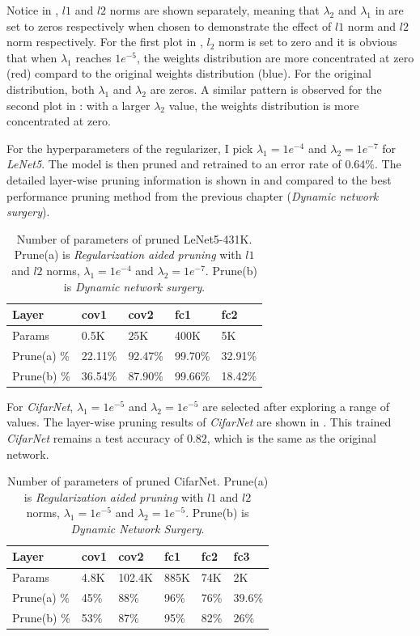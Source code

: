 \documentclass[a4paper,12pt]{report}
\begin{document}
Notice in , $l1$ and $l2$ norms are shown separately,
meaning that $\lambda_{2}$ and $\lambda_{1}$ in  are set to
zeros respectively when chosen to demonstrate the effect of $l1$ norm
and $l2$ norm respectively.
For the first plot in , $l_2$ norm is set to zero and it is
obvious that when $\lambda_1$ reaches $1e^{-5}$, the weights distribution are
more concentrated at zero (red) compard to the original weights distribution (blue).
For the original distribution, both $\lambda_1$ and $\lambda_2$ are zeros.
A similar pattern is observed for the second plot in : with a
larger $\lambda_2$ value, the weights distribution is more concentrated at zero.

For the hyperparameters of the regularizer, I pick $\lambda_1 = 1e^{-4}$ and $\lambda_2 = 1e^{-7}$ for \textit{LeNet5}.
The model is then pruned and retrained to an error rate of $0.64\%$.
The detailed layer-wise pruning information is shown in 
and compared to the best performance pruning method from the previous chapter (\textit{Dynamic network surgery}).

\begin{table}[!h]
\centering
\begin{tabular}{|l|l|l|l|l|}
\hline
Layer			&cov1	    &cov2	&fc1	&fc2 	\\	 \hline
Params		& 0.5K		&25K	&400K	&5K \\ \hline
Prune(a) \%	& 22.11\%		&92.47\%	&99.70\%	&32.91\%	\\
\hline
Prune(b) \%	& 36.54\%		&87.90\%	&99.66\%	&18.42\%	 \\
\hline
\end{tabular}
\caption{Number of parameters of pruned LeNet5-431K.
Prune(a) is \textit{Regularization aided pruning} with $l1$ and $l2$ norms,
$\lambda_1 = 1e^{-4}$ and $\lambda_2 = 1e^{-7}$.
Prune(b) is \textit{Dynamic network surgery}.}
\label{tab:LeNetprunel1l2}
\end{table}

For \textit{CifarNet}, $\lambda_{1} = 1e^{-5}$ and $\lambda_{2} = 1e^{-5}$
are selected after exploring a range of values.
The layer-wise pruning results of \textit{CifarNet} are shown
in .
This trained \textit{CifarNet} remains a test accuracy of $0.82$, which is the
same as the original network.
\begin{table}[!h]
\centering
\begin{tabular}{|l|l|l|l|l|l|}
\hline
Layer			&cov1	&cov2		&fc1		&fc2		&fc3		\\ \hline
Params		& 4.8K		&102.4K	&885K	&74K		&2K 	\\
\hline
Prune(a) \%	& 45\%		&88\%	&96\%	&76\%	&39.6\% \\
\hline
Prune(b) \%	& 53\%		&87\%	&95\%	&82\%	&26\% \\
\hline
\end{tabular}
\caption{Number of parameters of pruned CifarNet.
Prune(a) is \textit{Regularization aided pruning} with $l1$ and $l2$ norms,
$\lambda_1 = 1e^{-5}$ and $\lambda_2 = 1e^{-5}$.
Prune(b) is \textit{Dynamic Network Surgery}.}
\label{tab:CifarNetPrunel1l2}
\end{table}
\end{document}
